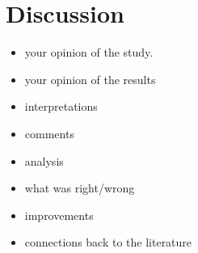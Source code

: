 \section{Discussion} \label{sec:Discussion}

\begin{itemize}
   \item
     your opinion of the study.
   \item
     your opinion of the results
   \item
     interpretations
   \item
     comments
   \item
     analysis
   \item
     what was right/wrong
   \item
     improvements
   \item
     connections back to the literature
\end{itemize}

